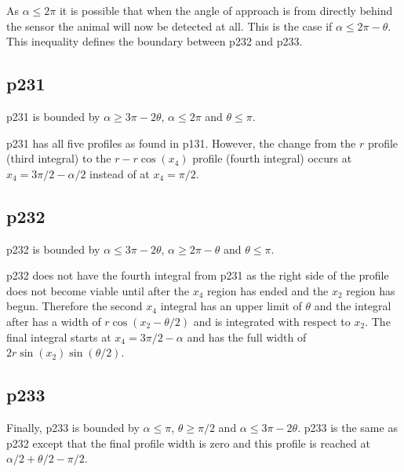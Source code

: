 As $\alpha \le 2\pi$ it is possible that when the angle of approach is from directly behind the sensor the animal will now be detected at all. This is the case if $\alpha\le 2\pi-\theta$. This inequality defines the boundary between p232 and p233.



\subsection{p231} \label{p231}

p231 is bounded by $\alpha \ge 3\pi - 2\theta$, $\alpha \le 2\pi$ and $\theta\le\pi$.

p231 has all five profiles as found in p131. However, the change from the $r$ profile (third integral) to the $r - r\cos(x_4)$ profile (fourth integral) occurs at $x_4 = 3\pi/2 - \alpha/2$ instead of at $x_4 = \pi/2$. 




\subsection{p232} \label{p232}

p232 is bounded by $\alpha \le 3\pi - 2\theta$, $\alpha\ge 2\pi-\theta$ and $\theta\le\pi$.

p232 does not have the fourth integral from p231 as the right side of the profile does not become viable until after the $x_4$ region has ended and the $x_2$ region has begun. Therefore the second $x_4$ integral has an upper limit of $\theta $ and the integral after has a width of $r\cos(x_2 - \theta/2)$ and is integrated with respect to $x_2$. The final integral starts at $x_4 = 3\pi/2 - \alpha$ and has the full width of $2r\sin(x_2)\sin(\theta/2)$.



\subsection{p233} \label{p233}

Finally, p233 is bounded by $\alpha\le \pi$, $\theta\ge \pi/2$ and $\alpha \le 3\pi - 2\theta$. p233 is the same as p232 except that the final profile width is zero and this profile is reached at $\alpha/2+\theta/2-\pi/2$. 



